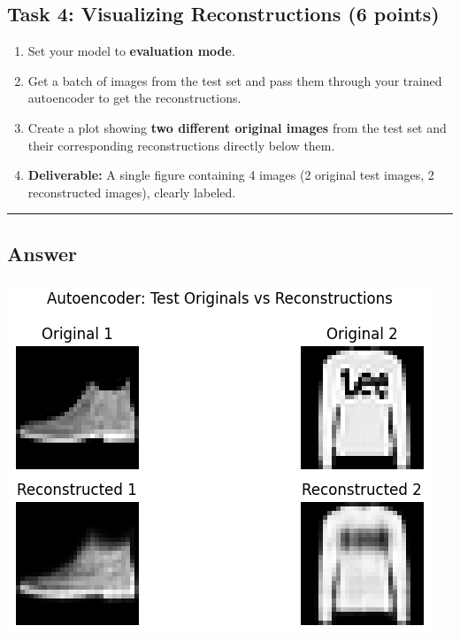 \documentclass[
  letterpaper,
  DIV=11,
  numbers=noendperiod]{scrartcl}
\providecommand{\tightlist}{%
  \setlength{\itemsep}{0pt}\setlength{\parskip}{0pt}}\usepackage{longtable,booktabs,array}
\begin{document}
\subsection{Task 4: Visualizing Reconstructions (6
points)}\label{task-4-visualizing-reconstructions-6-points}

\begin{enumerate}
\def\labelenumi{\arabic{enumi}.}
\tightlist
\item
  Set your model to \textbf{evaluation mode}.
\item
  Get a batch of images from the test set and pass them through your
  trained autoencoder to get the reconstructions.
\item
  Create a plot showing \textbf{two different original images} from the
  test set and their corresponding reconstructions directly below them.
\item
  \textbf{Deliverable:} A single figure containing 4 images (2 original
  test images, 2 reconstructed images), clearly labeled.
\end{enumerate}

\begin{center}\rule{0.5\linewidth}{0.5pt}\end{center}

\subsection{Answer}\label{answer-6}

\includegraphics{CS541_HW3_git_files/figure-latex/cs541_hw3_p4_d1a-task4-output-1.png}
\end{document}
